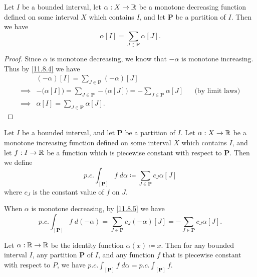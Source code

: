 \begin{ac}\label{ac:11.8.3}
  Let \(I\) be a bounded interval, let \(\alpha : X \to \mathbb{R}\) be a monotone decreasing function defined on some interval \(X\) which contains \(I\), and let \(\mathbf{P}\) be a partition of \(I\).
  Then we have
  \[
    \alpha[I] = \sum_{J \in \mathbf{P}} \alpha[J].
  \]
\end{ac}

\begin{proof}
  Since \(\alpha\) is monotone decreasing, we know that \(-\alpha\) is monotone increasing.
  Thus by \cref{11.8.4} we have
  \begin{align*}
             & (-\alpha)[I] = \sum_{J \in \mathbf{P}} (-\alpha)[J]                                                                                  \\
    \implies & -\big(\alpha[I]\big) = \sum_{J \in \mathbf{P}} -\big(\alpha[J]\big) = -\sum_{J \in \mathbf{P}} \alpha[J] &  & \text{(by limit laws)} \\
    \implies & \alpha[I] = \sum_{J \in \mathbf{P}} \alpha[J].
  \end{align*}
\end{proof}

\begin{defn}\label{11.8.5}
  Let \(I\) be a bounded interval, and let \(\mathbf{P}\) be a partition of \(I\).
  Let \(\alpha : X \to \mathbb{R}\) be a monotone increasing function defined on some interval \(X\) which contains \(I\), and let \(f : I \to \mathbb{R}\) be a function which is piecewise constant with respect to \(\mathbf{P}\).
  Then we define
  \[
    p.c. \int_{[\mathbf{P}]} f \; d \alpha \coloneqq \sum_{J \in \mathbf{P}} c_J \alpha[J]
  \]
  where \(c_J\) is the constant value of \(f\) on \(J\).
\end{defn}

\begin{note}
  When \(\alpha\) is monotone decreasing, by \cref{11.8.5} we have
  \[
    p.c. \int_{[\mathbf{P}]} f \; d (-\alpha) = \sum_{J \in \mathbf{P}} c_J (-\alpha)[J] = - \sum_{J \in \mathbf{P}} c_J \alpha[J].
  \]
\end{note}

\setcounter{thm}{6}
\begin{eg}\label{11.8.7}
  Let \(\alpha : \mathbb{R} \to \mathbb{R}\) be the identity function \(\alpha(x) \coloneqq x\).
  Then for any bounded interval \(I\), any partition \(\mathbf{P}\) of \(I\), and any function \(f\) that is piecewise constant with respect to \(P\), we have \(p.c. \int_{[\mathbf{P}]} f \; d \alpha = p.c. \int_{[\mathbf{P}]} f\).
\end{eg}

